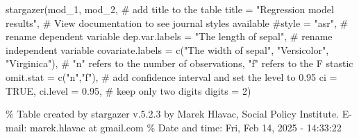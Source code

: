 \documentclass[
  letterpaper,
  DIV=11,
  numbers=noendperiod]{scrartcl}
\newenvironment{Shaded}{\begin{snugshade}}{\end{snugshade}}
\newcommand{\AttributeTok}[1]{\textcolor[rgb]{0.40,0.45,0.13}{#1}}
\newcommand{\CommentTok}[1]{\textcolor[rgb]{0.37,0.37,0.37}{#1}}
\newcommand{\ConstantTok}[1]{\textcolor[rgb]{0.56,0.35,0.01}{#1}}
\newcommand{\DecValTok}[1]{\textcolor[rgb]{0.68,0.00,0.00}{#1}}
\newcommand{\FloatTok}[1]{\textcolor[rgb]{0.68,0.00,0.00}{#1}}
\newcommand{\FunctionTok}[1]{\textcolor[rgb]{0.28,0.35,0.67}{#1}}
\newcommand{\NormalTok}[1]{\textcolor[rgb]{0.00,0.23,0.31}{#1}}
\newcommand{\StringTok}[1]{\textcolor[rgb]{0.13,0.47,0.30}{#1}}
\begin{document}
\begin{Shaded}
\begin{Highlighting}[]
\FunctionTok{stargazer}\NormalTok{(mod\_1, mod\_2,}
          \CommentTok{\# add title to the table}
          \AttributeTok{title =} \StringTok{"Regression model results"}\NormalTok{,}
          \CommentTok{\# View documentation to see journal styles available}
          \CommentTok{\#style = "asr",}
          \CommentTok{\# rename dependent variable}
          \AttributeTok{dep.var.labels =} \StringTok{"The length of sepal"}\NormalTok{,}
          \CommentTok{\# rename independent variable}
          \AttributeTok{covariate.labels =} \FunctionTok{c}\NormalTok{(}\StringTok{"The width of sepal"}\NormalTok{, }\StringTok{"Versicolor"}\NormalTok{, }\StringTok{"Virginica"}\NormalTok{),}
          \CommentTok{\# "n" refers to the number of observations, "f" refers to the F stastic}
          \AttributeTok{omit.stat =} \FunctionTok{c}\NormalTok{(}\StringTok{"n"}\NormalTok{,}\StringTok{"f"}\NormalTok{),}
          \CommentTok{\# add confidence interval and set the level to 0.95}
          \AttributeTok{ci =} \ConstantTok{TRUE}\NormalTok{, }\AttributeTok{ci.level =} \FloatTok{0.95}\NormalTok{,}
          \CommentTok{\# keep only two digits}
          \AttributeTok{digits =} \DecValTok{2}\NormalTok{)}
\end{Highlighting}
\end{Shaded}

\% Table created by stargazer v.5.2.3 by Marek Hlavac, Social Policy
Institute. E-mail: marek.hlavac at gmail.com \% Date and time: Fri, Feb
14, 2025 - 14:33:22
\end{document}
